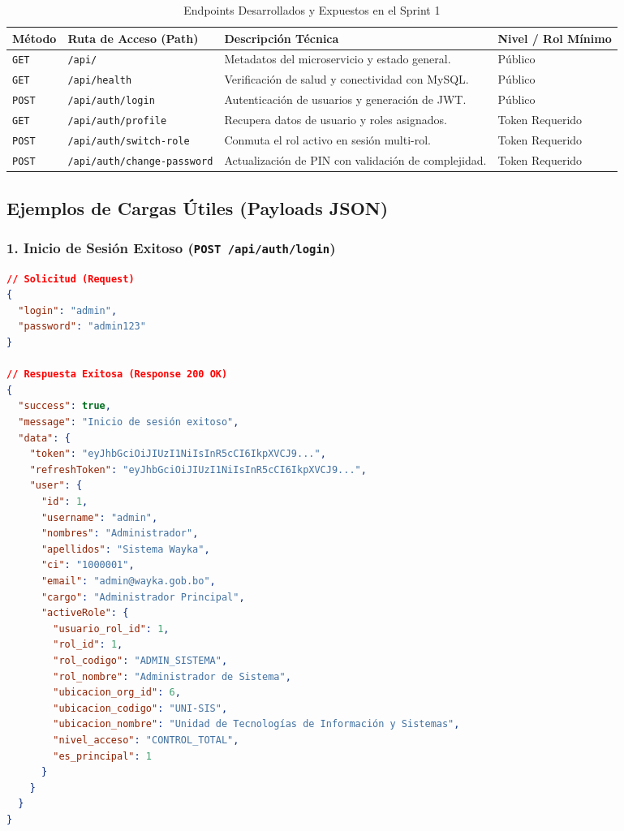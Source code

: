 \documentclass[a4paper,12pt]{article}
\begin{document}
\begin{table}[H]
\centering
\small
\caption{Endpoints Desarrollados y Expuestos en el Sprint 1}
\label{tab:endpoints}
\begin{tabularx}{\linewidth}{@{}l>{\raggedright\arraybackslash}p{5.5cm}Y>{\raggedright\arraybackslash}p{2.7cm}@{}}
\toprule
\textbf{Método} & \textbf{Ruta de Acceso (Path)} & \textbf{Descripción Técnica} & \textbf{Nivel / Rol Mínimo} \\
\midrule
\texttt{GET} & \texttt{/api/} & Metadatos del microservicio y estado general. & Público \\
\texttt{GET} & \texttt{/api/health} & Verificación de salud y conectividad con MySQL. & Público \\
\texttt{POST} & \texttt{/api/auth/login} & Autenticación de usuarios y generación de JWT. & Público \\
\texttt{GET} & \texttt{/api/auth/profile} & Recupera datos de usuario y roles asignados. & Token Requerido \\
\texttt{POST} & \texttt{/api/auth/switch-role} & Conmuta el rol activo en sesión multi-rol. & Token Requerido \\
\texttt{POST} & \texttt{/api/auth/\allowbreak change-password} & Actualización de PIN con validación de complejidad. & Token Requerido \\
\bottomrule
\end{tabularx}
\end{table}

\subsection{Ejemplos de Cargas Útiles (Payloads JSON)}

\subsubsection{1. Inicio de Sesión Exitoso (\texttt{POST /api/auth/login})}
\begin{lstlisting}[language=json]
// Solicitud (Request)
{
  "login": "admin",
  "password": "admin123"
}

// Respuesta Exitosa (Response 200 OK)
{
  "success": true,
  "message": "Inicio de sesión exitoso",
  "data": {
    "token": "eyJhbGciOiJIUzI1NiIsInR5cCI6IkpXVCJ9...",
    "refreshToken": "eyJhbGciOiJIUzI1NiIsInR5cCI6IkpXVCJ9...",
    "user": {
      "id": 1,
      "username": "admin",
      "nombres": "Administrador",
      "apellidos": "Sistema Wayka",
      "ci": "1000001",
      "email": "admin@wayka.gob.bo",
      "cargo": "Administrador Principal",
      "activeRole": {
        "usuario_rol_id": 1,
        "rol_id": 1,
        "rol_codigo": "ADMIN_SISTEMA",
        "rol_nombre": "Administrador de Sistema",
        "ubicacion_org_id": 6,
        "ubicacion_codigo": "UNI-SIS",
        "ubicacion_nombre": "Unidad de Tecnologías de Información y Sistemas",
        "nivel_acceso": "CONTROL_TOTAL",
        "es_principal": 1
      }
    }
  }
}
\end{lstlisting}
\end{document}
